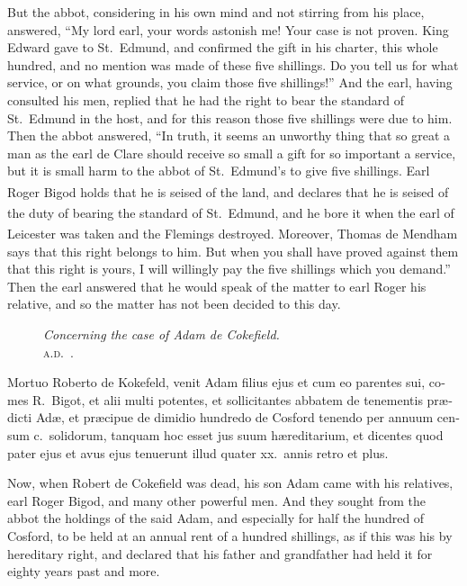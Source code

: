 \documentclass{book}
\newcounter{engnote}
\newcommand{\engnotenum}{\textsuperscript{\arabic{engnote}\stepcounter{engnote}}}
\newcommand{\blockhead}[4][]{
\begin{figure}
\centering
\vspace{#4}
\parbox{2.75cm}{\begin{center}\footnotesize \color{BrickRed} \emph{#2}\\ #1 \end{center}}
\end{figure}
}
\begin{document}
\begin{paracol}{2}
But the abbot, considering in his own mind and not stirring from his place, answered, ``My lord earl, your words astonish me! Your case is not proven. King Edward gave to St.\ Edmund, and confirmed the gift in his charter, this whole hundred, and no mention was made of these five shillings. Do you tell us for what service, or on what grounds, you claim those five shillings!'' And the earl, having consulted his men, replied that he had the right to bear the standard of St.\ Edmund in the host, and for this reason those five shillings were due to him. Then the abbot answered, ``In truth, it seems an unworthy thing that so great a man as the earl de Clare should receive so small a gift for so important a service, but it is small harm to the abbot of St.\ Edmund's to give five shillings. Earl Roger Bigod\engnotenum{} holds that he is seised of the land, and declares that he is seised of the duty of bearing the standard of St.\ Edmund,\engnotenum{} and he bore it when the earl of Leicester was taken and the Flemings destroyed. Moreover, Thomas de Mendham\engnotenum{} says that this right belongs to him. But when you shall have proved against them that this right is yours, I will willingly pay the five shillings which you demand.'' Then the earl answered that he would speak of the matter to earl Roger his relative, and so the matter has not been decided to this day.

\switchcolumn*

\begin{otherlanguage}{latin}
\blockhead[\textsc{a.d}.\ .]{Concerning the case of Adam de Cokefield.}{4}{-.45cm}
Mortuo Roberto de Kokefeld, venit Adam filius ejus et cum eo parentes sui, comes R.\ Bigot, et alii multi potentes, et sollicitantes abbatem de tenementis pr\ae{}dicti Ad\ae{}, et pr\ae{}cipue de dimidio hundredo de Cosford tenendo per annuum censum c.\ solidorum, tanquam hoc esset jus suum h\ae{}reditarium, et dicentes quod pater ejus et avus ejus tenuerunt illud quater xx.\ annis retro et plus.

\end{otherlanguage}

\switchcolumn

Now, when Robert de Cokefield was dead, his son Adam came with his relatives, earl Roger Bigod, and many other powerful men. And they sought from the abbot the holdings of the said Adam, and especially for half the hundred of Cosford, to be held at an annual rent of a hundred shillings, as if this was his by hereditary right, and declared that his father and grandfather had held it for eighty years past and more.


\end{paracol}
\end{document}
